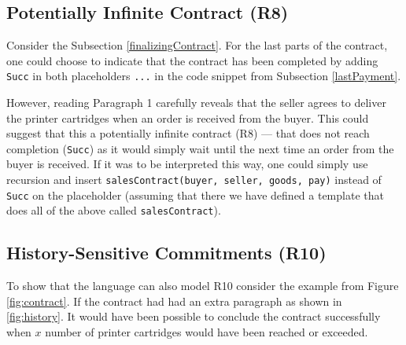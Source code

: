 \documentclass{ituthesis}
\begin{document}
\subsection{Potentially Infinite Contract (R8)} \label{infinite}
Consider the Subsection \ref{finalizingContract}. For the last parts of the contract, one could choose to indicate that the contract has been completed by adding \texttt{Succ} in both placeholders \texttt{...} in the code snippet from Subsection \ref{lastPayment}. 

However, reading Paragraph 1 carefully reveals that the seller agrees to deliver the printer cartridges when an order is received from the buyer. This could suggest that this a potentially infinite contract (R8) --- that does not reach completion (\texttt{Succ}) as it would simply wait until the next time an order from the buyer is received. If it was to be interpreted this way, one could simply use recursion and insert \texttt{salesContract(buyer, seller, goods, pay)} instead of \texttt{Succ} on the placeholder (assuming that there we have defined a template that does all of the above called \texttt{salesContract}).

\subsection{History-Sensitive Commitments (R10)}
To show that the language can also model R10 consider the example from Figure \ref{fig:contract}. If the contract had had an extra paragraph as shown in \ref{fig:history}. It would have been possible to conclude the contract successfully when $x$ number of printer cartridges would have been reached or exceeded.
\end{document}
